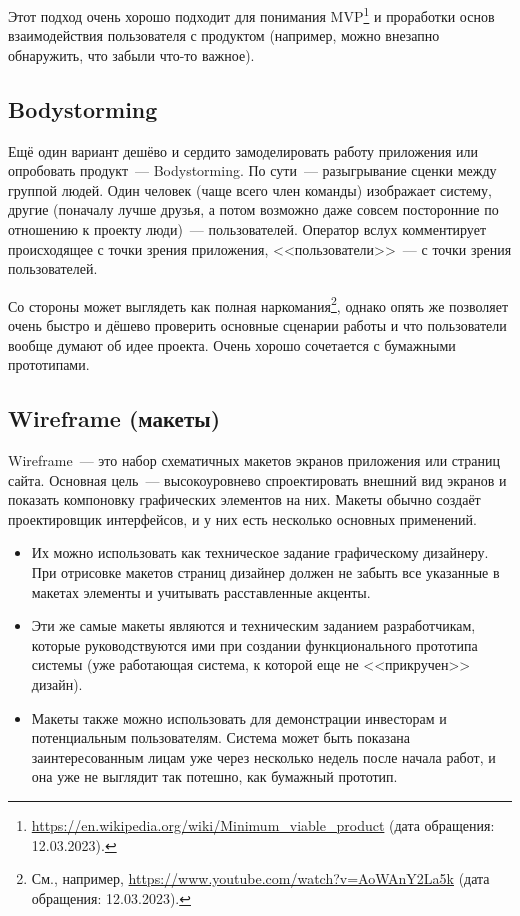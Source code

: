 \documentclass{../../text-style}
\begin{document}
Этот подход очень хорошо подходит для понимания MVP\footnote{\url{https://en.wikipedia.org/wiki/Minimum_viable_product} (дата обращения: 12.03.2023).} и проработки основ взаимодействия пользователя с продуктом (например, можно внезапно обнаружить, что забыли что-то важное).

\subsection{Bodystorming}

Ещё один вариант дешёво и сердито замоделировать работу приложения или опробовать продукт~--- Bodystorming. По сути~--- разыгрывание сценки между группой людей. Один человек (чаще всего член команды) изображает систему, другие (поначалу лучше друзья, а потом возможно даже совсем посторонние по отношению к проекту люди)~--- пользователей. Оператор вслух комментирует происходящее с точки зрения приложения, <<пользователи>>~--- с точки зрения пользователей.

Со стороны может выглядеть как полная наркомания\footnote{См., например, \url{https://www.youtube.com/watch?v=AoWAnY2La5k} (дата обращения: 12.03.2023).}, однако опять же позволяет очень быстро и дёшево проверить основные сценарии работы и что пользователи вообще думают об идее проекта. Очень хорошо сочетается с бумажными прототипами.

\subsection{Wireframe (макеты)}

Wireframe~--- это набор схематичных макетов экранов приложения или страниц сайта. Основная цель~--- высокоуровнево спроектировать внешний вид экранов и показать компоновку графических элементов на них. Макеты обычно создаёт проектировщик интерфейсов, и у них есть несколько основных применений.

\begin{itemize}
    \item Их можно использовать как техническое задание графическому дизайнеру. При отрисовке макетов страниц дизайнер должен не забыть все указанные в макетах элементы и учитывать расставленные акценты.
    \item Эти же самые макеты являются и техническим заданием разработчикам, которые руководствуются ими при создании функционального прототипа системы (уже работающая система, к которой еще не <<прикручен>> дизайн).
    \item Макеты также можно использовать для демонстрации инвесторам и потенциальным пользователям. Система может быть показана заинтересованным лицам уже через несколько недель после начала работ, и она уже не выглядит так потешно, как бумажный прототип.
\end{itemize}
\end{document}
